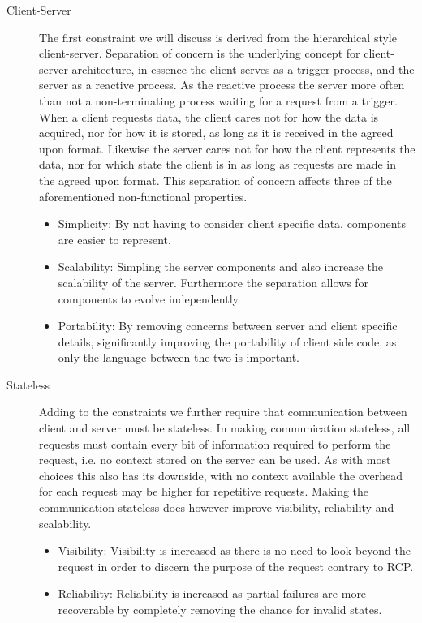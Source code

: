 \begin{description}
    \item [Client-Server] The first constraint we will discuss is derived from the hierarchical style client-server.
    Separation of concern is the underlying concept for client-server architecture, in essence the client serves as a trigger process, and the server as a reactive process.
    As the reactive process the server more often than not a non-terminating process waiting for a request from a trigger.
    When a client requests data, the client cares not for how the data is acquired, nor for how it is stored, as long as it is received in the agreed upon format.
    Likewise the server cares not for how the client represents the data, nor for which state the client is in as long as requests are made in the agreed upon format.
    This separation of concern affects three of the aforementioned non-functional properties.
    \begin{itemize}
        \item Simplicity: By not having to consider client specific data, components are easier to represent.
        \item Scalability: Simpling the server components and also increase the scalability of the server. Furthermore the separation allows for components to evolve independently
        \item Portability: By removing concerns between server and client specific details, significantly improving the portability of client side code, as only the language between the two is important.
    \end{itemize}
    \item [Stateless] Adding to the constraints we further require that communication between client and server must be stateless.
    In making communication stateless, all requests must contain every bit of information required to perform the request, i.e. no context stored on the server can be used.
    As with most choices this also has its downside, with no context available the overhead for each request may be higher for repetitive requests.
    Making the communication stateless does however improve visibility, reliability and scalability.
    \begin{itemize}
        \item Visibility: Visibility is increased as there is no need to look beyond the request in order to discern the purpose of the request contrary to RCP.
        \item Reliability: Reliability is increased as partial failures are more recoverable by completely removing the chance for invalid states.

\end{itemize}
\end{description}
